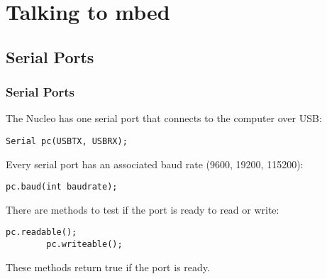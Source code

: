 \section{Talking to mbed}
\label{sec:talking}

\subsection{Serial Ports}
\label{sub:uart}
\begin{frame}[fragile]
	\frametitle{Serial Ports}
	The Nucleo has one serial port that connects to the computer over USB:
	\begin{lstlisting}[numbers=none]
		Serial pc(USBTX, USBRX);
	\end{lstlisting}
	\vfill
	Every serial port has an associated baud rate (9600, 19200, 115200):
	\begin{lstlisting}[numbers=none]
		pc.baud(int baudrate);
	\end{lstlisting}
	\vfill
	There are methods to test if the port is ready to read or write:
	\begin{lstlisting}[numbers=none,multicols=2]
		pc.readable();
		pc.writeable();
	\end{lstlisting}
	These methods return true if the port is ready.
\end{frame}

